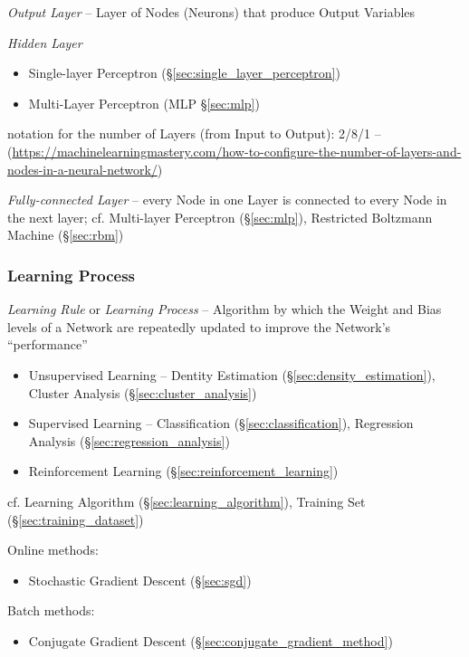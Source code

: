 \emph{Output Layer} -- Layer of Nodes (Neurons) that produce Output Variables

\emph{Hidden Layer}

\begin{itemize}
  \item Single-layer Perceptron (\S\ref{sec:single_layer_perceptron})
  \item Multi-Layer Perceptron (MLP \S\ref{sec:mlp})
\end{itemize}

notation for the number of Layers (from Input to Output): 2/8/1 --
(\url{https://machinelearningmastery.com/how-to-configure-the-number-of-layers-and-nodes-in-a-neural-network/})

\emph{Fully-connected Layer} -- every Node in one Layer is connected to every
Node in the next layer; cf. Multi-layer Perceptron (\S\ref{sec:mlp}), Restricted
Boltzmann Machine (\S\ref{sec:rbm})



\subsubsection{Learning Process}\label{sec:learning_process}

\emph{Learning Rule} or \emph{Learning Process} -- Algorithm by which the Weight
and Bias levels of a Network are repeatedly updated to improve the Network's
``performance''

\begin{itemize}
  \item Unsupervised Learning -- Dentity Estimation
    (\S\ref{sec:density_estimation}), Cluster Analysis
    (\S\ref{sec:cluster_analysis})
  \item Supervised Learning -- Classification (\S\ref{sec:classification}),
    Regression Analysis (\S\ref{sec:regression_analysis})
  \item Reinforcement Learning (\S\ref{sec:reinforcement_learning})
\end{itemize}

\fist cf. Learning Algorithm (\S\ref{sec:learning_algorithm}),
Training Set (\S\ref{sec:training_dataset})

Online methods:
\begin{itemize}
  \item Stochastic Gradient Descent (\S\ref{sec:sgd})
\end{itemize}

Batch methods:
\begin{itemize}
  \item Conjugate Gradient Descent (\S\ref{sec:conjugate_gradient_method})
\end{itemize}



